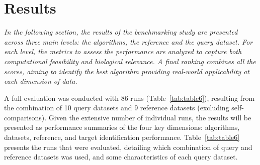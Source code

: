 
%


\chapter{Results}
\label{cha:results}

\textit{In the following section, the results of the benchmarking study are presented across three main levels: the algorithms, the reference and the query dataset. For each level, the metrics to assess the performance are analyzed to capture both computational feasibility and biological relevance. A final ranking combines all the scores, aiming to identify the best algorithm providing real-world applicability at each dimension of data.}

A full evaluation was conducted with 86 runs (Table~\ref{tab:table6}), resulting from the combination of 10 query datasets and 9 reference datasets (excluding self-comparisons). Given the extensive number of individual runs, the results will be presented as performance summaries of the four key dimensions: algorithms, datasets, reference, and target identification performance. Table~\ref{tab:table6} presents the runs that were evaluated, detailing which combination of query and reference datasets was used, and some characteristics of each query dataset.


